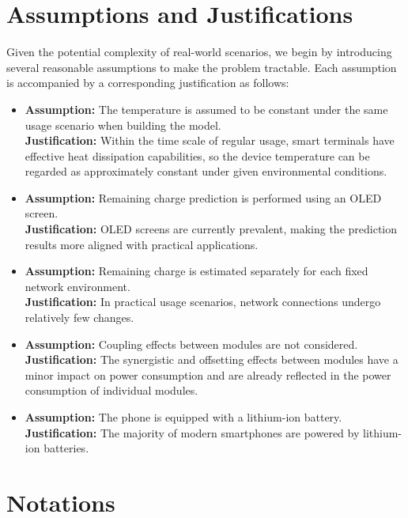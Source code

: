 \documentclass{mcmthesis}  %
\begin{document}
	
	\section{Assumptions and Justifications}  %
	Given the potential complexity of real-world scenarios, we begin by introducing several reasonable assumptions to make the problem tractable. Each assumption is accompanied by a corresponding justification as follows:
	\begin{itemize}
		\item \textbf{Assumption:} The temperature is assumed to be constant under the same usage scenario when building the model.
		\\
		\textbf{Justification:} Within the time scale of regular usage, smart terminals have effective heat dissipation capabilities, so the device temperature can be regarded as approximately constant under given environmental conditions.
		
		\item \textbf{Assumption:} Remaining charge prediction is performed using an OLED screen.
		\\
		\textbf{Justification:} OLED screens are currently prevalent, making the prediction results more aligned with practical applications.
		
		\item \textbf{Assumption:} Remaining charge is estimated separately for each fixed network environment.
		\\
		\textbf{Justification:} In practical usage scenarios, network connections undergo relatively few changes.
		
		\item \textbf{Assumption:} Coupling effects between modules are not considered.
		\\
		\textbf{Justification:} The synergistic and offsetting effects between modules have a minor impact on power consumption and are already reflected in the power consumption of individual modules.
		
		\item \textbf{Assumption:} The phone is equipped with a lithium-ion battery.
		\\
		\textbf{Justification:} The majority of modern smartphones are powered by lithium-ion batteries.
	\end{itemize}
	
	\newpage
	\section{Notations}  %
	
\end{document}

